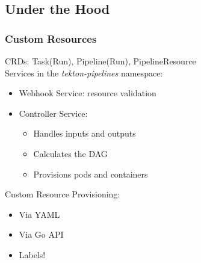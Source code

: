 \documentclass[aspectratio=169,11pt,hyperref={colorlinks=true}]{beamer}
\begin{document}
\begin{lblackrwhiteframe}
\begin{lblackrwhiteframe}
\begin{blackframe}
\section{Under the Hood}

\begin{grayframe}
  \frametitle{Custom Resources}
  CRDs: Task(Run), Pipeline(Run), PipelineResource \\
  \vspace{3ex}
  Services in the {\em tekton-pipelines} namespace:
  \begin{itemize}
    \item Webhook Service: resource validation
    \item Controller Service:
    \begin{itemize}
      \item Handles inputs and outputs
      \item Calculates the DAG
      \item Provisions pods and containers
    \end{itemize}
  \end{itemize}
  \vspace{3ex}
  Custom Resource Provisioning:
  \begin{itemize}
    \item Via YAML
    \item Via Go API
    \item Labels!
  \end{itemize}
\end{grayframe}


\end{blackframe}
\end{lblackrwhiteframe}
\end{lblackrwhiteframe}
\end{document}
